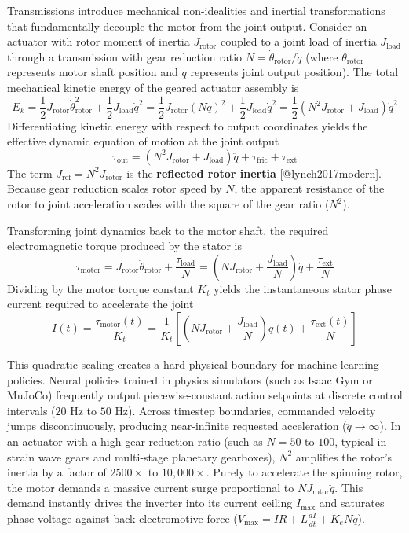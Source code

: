 \documentclass[
  letterpaper,
  DIV=11,
  numbers=noendperiod]{scrartcl}
\begin{document}
Transmissions introduce mechanical non-idealities and inertial
transformations that fundamentally decouple the motor from the joint
output. Consider an actuator with rotor moment of inertia
\(J_{\text{rotor}}\) coupled to a joint load of inertia
\(J_{\text{load}}\) through a transmission with gear reduction ratio
\(N = \dot{\theta}_{\text{rotor}} / \dot{q}\) (where
\(\theta_{\text{rotor}}\) represents motor shaft position and \(q\)
represents joint output position). The total mechanical kinetic energy
of the geared actuator assembly is
\[E_k = \frac{1}{2} J_{\text{rotor}} \dot{\theta}_{\text{rotor}}^2 + \frac{1}{2} J_{\text{load}} \dot{q}^2 = \frac{1}{2} J_{\text{rotor}} (N \dot{q})^2 + \frac{1}{2} J_{\text{load}} \dot{q}^2 = \frac{1}{2} \left( N^2 J_{\text{rotor}} + J_{\text{load}} \right) \dot{q}^2\]
Differentiating kinetic energy with respect to output coordinates yields
the effective dynamic equation of motion at the joint output
\[\tau_{\text{out}} = \left( N^2 J_{\text{rotor}} + J_{\text{load}} \right) \ddot{q} + \tau_{\text{fric}} + \tau_{\text{ext}}\]
The term \(J_{\text{ref}} = N^2 J_{\text{rotor}}\) is the
\textbf{reflected rotor inertia} {[}@lynch2017modern{]}. Because gear
reduction scales rotor speed by \(N\), the apparent resistance of the
rotor to joint acceleration scales with the square of the gear ratio
(\(N^2\)).

Transforming joint dynamics back to the motor shaft, the required
electromagnetic torque produced by the stator is
\[\tau_{\text{motor}} = J_{\text{rotor}} \ddot{\theta}_{\text{rotor}} + \frac{\tau_{\text{load}}}{N} = \left( N J_{\text{rotor}} + \frac{J_{\text{load}}}{N} \right) \ddot{q} + \frac{\tau_{\text{ext}}}{N}\]
Dividing by the motor torque constant \(K_t\) yields the instantaneous
stator phase current required to accelerate the joint
\[I(t) = \frac{\tau_{\text{motor}}(t)}{K_t} = \frac{1}{K_t} \left[ \left( N J_{\text{rotor}} + \frac{J_{\text{load}}}{N} \right) \ddot{q}(t) + \frac{\tau_{\text{ext}}(t)}{N} \right]\]

This quadratic scaling creates a hard physical boundary for machine
learning policies. Neural policies trained in physics simulators (such
as Isaac Gym or MuJoCo) frequently output piecewise-constant action
setpoints at discrete control intervals (\(20\text{ Hz}\) to
\(50\text{ Hz}\)). Across timestep boundaries, commanded velocity jumps
discontinuously, producing near-infinite requested acceleration
(\(\ddot{q} \to \infty\)). In an actuator with a high gear reduction
ratio (such as \(N = 50\) to \(100\), typical in strain wave gears and
multi-stage planetary gearboxes), \(N^2\) amplifies the rotor's inertia
by a factor of \(2500\times\) to \(10{,}000\times\). Purely to
accelerate the spinning rotor, the motor demands a massive current surge
proportional to \(N J_{\text{rotor}} \ddot{q}\). This demand instantly
drives the inverter into its current ceiling \(I_{\max}\) and saturates
phase voltage against back-electromotive force
(\(V_{\max} = I R + L \frac{dI}{dt} + K_e N \dot{q}\)).
\end{document}
